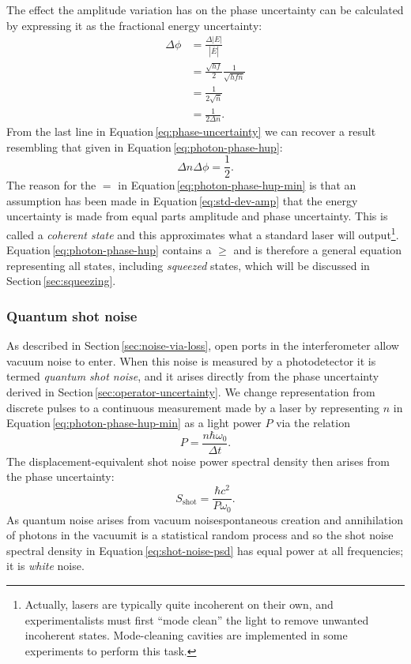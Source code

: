 The effect the amplitude variation has on the phase uncertainty can be calculated by expressing it as the fractional energy uncertainty:
\begin{equation}
  \label{eq:phase-uncertainty}
  \begin{split}
    \Delta \phi &= \frac{\Delta \left| E \right|}{\left| \bar{E} \right|} \\
                &= \frac{\sqrt{hf}}{2} \frac{1}{\sqrt{hf \bar{n}}} \\
                &= \frac{1}{2 \sqrt{\bar{n}}} \\
                &= \frac{1}{2 \Delta n}.
  \end{split}
\end{equation}
From the last line in Equation\,\ref{eq:phase-uncertainty} we can recover a result resembling that given in Equation\,\ref{eq:photon-phase-hup}:
\begin{equation}
  \label{eq:photon-phase-hup-min}
  \Delta n \Delta \phi = \frac{1}{2}.
\end{equation}
The reason for the $=$ in Equation\,\ref{eq:photon-phase-hup-min} is that an assumption has been made in Equation\,\ref{eq:std-dev-amp} that the energy uncertainty is made from equal parts amplitude and phase uncertainty. This is called a \emph{coherent state} and this approximates what a standard laser will output\footnote{Actually, lasers are typically quite incoherent on their own, and experimentalists must first ``mode clean'' the light to remove unwanted incoherent states. Mode-cleaning cavities are implemented in some experiments to perform this task.}. Equation\,\ref{eq:photon-phase-hup} contains a $\geq$ and is therefore a general equation representing all states, including \emph{squeezed} states, which will be discussed in Section\,\ref{sec:squeezing}.

\subsubsection{\label{sec:quantum-shot-noise}Quantum shot noise}
As described in Section\,\ref{sec:noise-via-loss}, open ports in the interferometer allow vacuum noise to enter. When this noise is measured by a photodetector it is termed \emph{quantum shot noise}, and it arises directly from the phase uncertainty derived in Section\,\ref{sec:operator-uncertainty}. We change representation from discrete pulses to a continuous measurement made by a laser by representing $n$ in Equation\,\ref{eq:photon-phase-hup-min} as a light power $P$ via the relation
\begin{equation}
  P = \frac{n \hbar \omega_0}{\Delta t}.
\end{equation}
The displacement-equivalent shot noise power spectral density then arises from the phase uncertainty:
\begin{equation}
  \label{eq:shot-noise-psd}
  S_{\text{shot}} = \frac{\hbar c^2}{P \omega_0}.
\end{equation}
As quantum noise arises from vacuum noise\textemdash spontaneous creation and annihilation of photons in the vacuum\textemdash it is a statistical random process and so the shot noise spectral density in Equation\,\ref{eq:shot-noise-psd} has equal power at all frequencies; it is \emph{white} noise.

